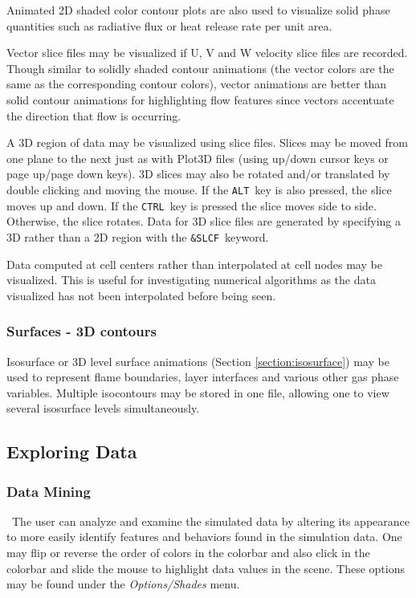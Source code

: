 \documentclass[11pt,twoside]{book}
\begin{document}
Animated 2D shaded color contour plots are also used to
visualize solid phase quantities such as radiative flux or
heat release rate per unit area.

Vector slice files may be visualized if U, V and W velocity slice files are recorded.
Though
similar to solidly shaded contour animations (the vector colors are
the same as the corresponding contour colors), vector animations are better
than solid contour animations for highlighting flow
features since vectors accentuate the direction that flow is occurring.

A 3D region of
data may be visualized using slice files.  Slices may be moved from one plane to
the next just as with Plot3D files (using up/down cursor keys or
page up/page down keys).
3D slices may also be rotated and/or translated by double clicking and
moving the mouse. If the {\tt ALT}\ key
is also pressed, the slice moves up and down.
If the {\tt CTRL}\ key is pressed the slice moves side to side.
Otherwise, the slice rotates.
Data for 3D slice files are generated by specifying a 3D rather than a
2D region with the {\tt \&SLCF}\ keyword.

Data computed at cell centers rather than interpolated at cell nodes may be visualized.
This is useful for investigating numerical algorithms as the data visualized
has not been interpolated before being seen.

\subsubsection{Surfaces - 3D contours}
Isosurface or 3D level surface animations (Section
\ref{section:isosurface}) may be used to represent flame
boundaries, layer interfaces and various other gas phase
variables. Multiple isocontours may be stored in one file,
allowing one to view several isosurface levels simultaneously.


\subsection{Exploring Data}

\subsubsection{Data Mining}\ The user can analyze and examine the simulated
data by altering its appearance to more easily identify features
and behaviors found in the simulation data. One may flip or
reverse the order of colors in the colorbar and also click in the
colorbar and slide the mouse to highlight data values in the
scene. These options may be found under the {\em Options/Shades}
menu.
\end{document}
